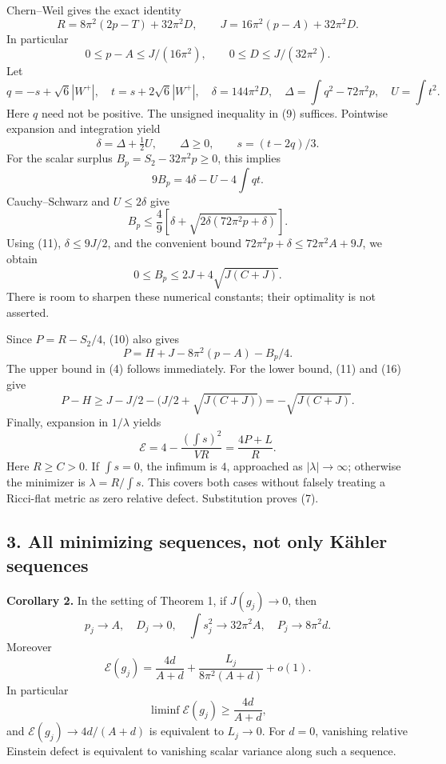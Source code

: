 \documentclass[
  11pt,
]{article}
\begin{document}
Chern--Weil gives the exact identity \[
 R=8\pi^2(2p-T)+32\pi^2D,
 \qquad J=16\pi^2(p-A)+32\pi^2D.
 \tag{10}
\] In particular \[
 0\le p-A\le J/(16\pi^2),\qquad 0\le D\le J/(32\pi^2).
 \tag{11}
\] Let \[
 q=-s+\sqrt6|W^+|,\quad t=s+2\sqrt6|W^+|,\quad
 \delta=144\pi^2D,\quad
 \Delta=\int q^2-72\pi^2p,\quad U=\int t^2.
 \tag{12}
\] Here \(q\) need not be positive. The unsigned inequality in (9)
suffices. Pointwise expansion and integration yield \[
 \delta=\Delta+\tfrac12 U,\qquad \Delta\ge0,\qquad
 s=(t-2q)/3.
 \tag{13}
\] For the scalar surplus \(B_p=S_2-32\pi^2p\ge0\), this implies \[
 9B_p=4\delta-U-4\int qt.
 \tag{14}
\] Cauchy--Schwarz and \(U\le2\delta\) give \[
 B_p\le\frac49
       \left[\delta+\sqrt{2\delta(72\pi^2p+\delta)}\right].
 \tag{15}
\] Using (11), \(\delta\le9J/2\), and the convenient bound
\(72\pi^2p+\delta\le72\pi^2A+9J\), we obtain \[
 \boxed{0\le B_p\le2J+4\sqrt{J(C+J)}.}
 \tag{16}
\] There is room to sharpen these numerical constants; their optimality
is not asserted.

Since \(P=R-S_2/4\), (10) also gives \[
 P=H+J-8\pi^2(p-A)-B_p/4.
 \tag{17}
\] The upper bound in (4) follows immediately. For the lower bound, (11)
and (16) give \[
 P-H\ge J-J/2-\bigl(J/2+\sqrt{J(C+J)}\bigr)
          =-\sqrt{J(C+J)}.
 \tag{18}
\] Finally, expansion in \(1/\lambda\) yields \[
 \mathcal E=4-\frac{(\int s)^2}{VR}
            =\frac{4P+L}{R}.
 \tag{19}
\] Here \(R\ge C>0\). If \(\int s=0\), the infimum is \(4\), approached
as \(|\lambda|\to\infty\); otherwise the minimizer is
\(\lambda=R/\int s\). This covers both cases without falsely treating a
Ricci-flat metric as zero relative defect. Substitution proves (7).

\hypertarget{all-minimizing-sequences-not-only-kuxe4hler-sequences}{%
\subsection{3. All minimizing sequences, not only Kähler
sequences}\label{all-minimizing-sequences-not-only-kuxe4hler-sequences}}

\textbf{Corollary 2.} In the setting of Theorem 1, if \(J(g_j)\to0\),
then \[
 p_j\to A,\quad D_j\to0,\quad
 \int s_j^2\to32\pi^2A,\quad P_j\to8\pi^2d.
 \tag{20}
\] Moreover \[
 \boxed{\mathcal E(g_j)
   =\frac{4d}{A+d}
       +\frac{L_j}{8\pi^2(A+d)}+o(1).}
 \tag{21}
\] In particular \[
 \liminf\mathcal E(g_j)\ge\frac{4d}{A+d},
 \tag{22}
\] and \(\mathcal E(g_j)\to4d/(A+d)\) is equivalent to \(L_j\to0\). For
\(d=0\), vanishing relative Einstein defect is equivalent to vanishing
scalar variance along such a sequence.
\end{document}
